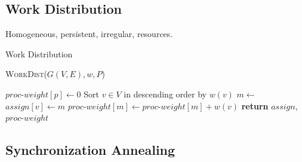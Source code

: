 \subsection{Work Distribution}
Homogeneous, persistent, irregular, resources.

\begin{algorithm}
\caption{Work Distribution}\label{alg:work_dist}
\textsc{WorkDist}($G(V,E), w, P$)
\begin{algorithmic}[1]
	\State $proc$-$weight[p] \gets 0$  %
\EndFor
\State Sort $v \in V$ in descending order by $w(v)$
        \State $m \gets $ 
	\State $assign[v] \gets m$ %
	\State $proc$-$weight[m] \gets proc$-$weight[m] + w(v)$ %
\EndFor
\State \textbf{return} $assign$, $proc$-$weight$ 
\end{algorithmic}
\end{algorithm}



\subsection{Synchronization Annealing}